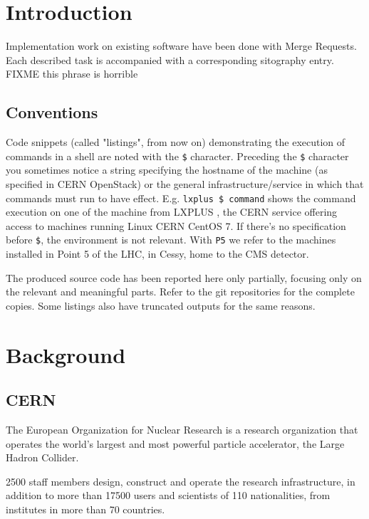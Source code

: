 \chapter{Introduction}

Implementation work on existing software have been done with Merge Requests. Each described task is accompanied with a corresponding sitography entry. FIXME this phrase is horrible


\section{Conventions}

Code snippets (called "listings", from now on) demonstrating the execution of commands in a shell are noted with the \texttt{\$} character. Preceding the \texttt{\$} character you sometimes notice a string specifying the hostname of the machine (as specified in CERN OpenStack) or the general infrastructure/service in which that commands must run to have effect. E.g. \texttt{lxplus \$ command} shows the command execution on one of the machine from LXPLUS \cite{LXPLUSServiceITDepartment-2020-10-01}, the CERN service offering access to machines running Linux CERN CentOS 7. If there's no specification before \texttt{\$}, the environment is not relevant. With \texttt{P5} we refer to the machines installed in Point 5 of the LHC, in Cessy, home to the CMS detector.

The produced source code has been reported here only partially, focusing only on the relevant and meaningful parts. Refer to the git repositories for the complete copies. Some listings also have truncated outputs for the same reasons.

\chapter{Background}

\section{CERN}

The European Organization for Nuclear Research is a research organization that operates the world’s largest and most powerful particle accelerator, the Large Hadron Collider.

2500 staff members design, construct and operate the research infrastructure, in addition to more than 17500 users and scientists of 110 nationalities, from institutes in more than 70 countries.

